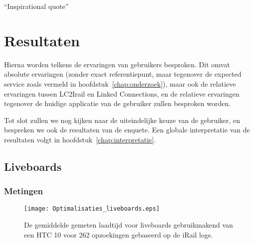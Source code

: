 \begin{savequote}[0.55\linewidth]
	``Inspirational quote''
\end{savequote}

\chapter{Resultaten}
\label{chap:resultaten}

Hierna worden telkens de ervaringen van gebruikers besproken. Dit omvat absolute ervaringen (zonder exact referentiepunt, maar tegenover de expected service zoals vermeld in hoofdstuk~\ref{chap:onderzoek}), maar ook de relatieve ervaringen tussen LC2Irail en Linked Connections, en de relatieve ervaringen tegenover de huidige applicatie van de gebruiker zullen besproken worden.

Tot slot zullen we nog kijken naar de uiteindelijke keuze van de gebruiker, en bespreken we ook de resultaten van de enquete. Een globale interpretatie van de resultaten volgt in hoofdstuk~\ref{chap:interpretatie}.

\section{Liveboards}
\subsection{Metingen}
\begin{figure}[h]
	\centering
	\texttt{[image: Optimalisaties\_liveboards.eps]}
		\caption[Gemeten laadtijd liveboards]{De gemiddelde gemeten laadtijd voor liveboards gebruikmakend van een HTC 10 voor 262 opzoekingen gebaseerd op de iRail logs. }
	\label{fig:liveboardlabtest}
\end{figure}
%		

